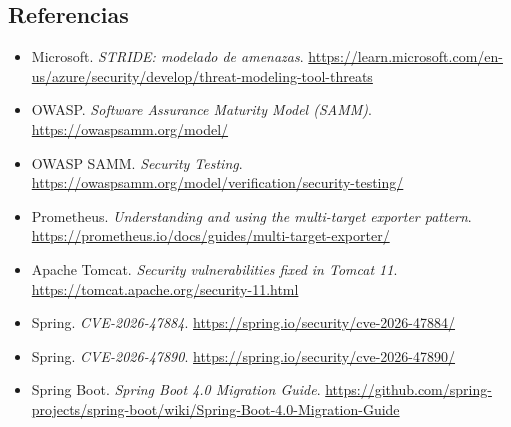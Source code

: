 \documentclass[12pt,a4paper]{article}
\begin{document}
\subsection{Referencias}

\begin{itemize}[leftmargin=*]
  \item Microsoft. \emph{STRIDE: modelado de amenazas}.
  \url{https://learn.microsoft.com/en-us/azure/security/develop/threat-modeling-tool-threats}
  \item OWASP. \emph{Software Assurance Maturity Model (SAMM)}.
  \url{https://owaspsamm.org/model/}
  \item OWASP SAMM. \emph{Security Testing}.
  \url{https://owaspsamm.org/model/verification/security-testing/}
  \item Prometheus. \emph{Understanding and using the multi-target exporter pattern}.
  \url{https://prometheus.io/docs/guides/multi-target-exporter/}
  \item Apache Tomcat. \emph{Security vulnerabilities fixed in Tomcat 11}.
  \url{https://tomcat.apache.org/security-11.html}
  \item Spring. \emph{CVE-2026-47884}. \url{https://spring.io/security/cve-2026-47884/}
  \item Spring. \emph{CVE-2026-47890}. \url{https://spring.io/security/cve-2026-47890/}
  \item Spring Boot. \emph{Spring Boot 4.0 Migration Guide}.
  \url{https://github.com/spring-projects/spring-boot/wiki/Spring-Boot-4.0-Migration-Guide}
\end{itemize}
\end{document}
